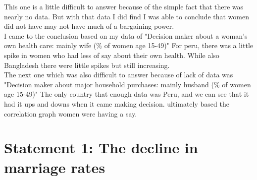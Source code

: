 \documentclass[12pt]{article}
\begin{document}
\begin{enumerate}
This one is a little difficult to answer because of the simple fact that there was nearly no data. But with that data I did find I was able to conclude that women did not have may not have much of a bargaining power.\\

I came to the conclusion based on my data of  "Decision maker about a woman's own health care: mainly wife (\% of women age 15-49)" For peru, there was a little spike in women who had less of say about their own health.  While also Bangladesh there were little spikes but still increasing. \\


The next one which was also difficult to answer because of lack of data was "Decision maker about major household purchases: mainly husband (\% of women age 15-49)"
The only country that enough data was Peru, and we can see that it had it ups and downs when it came making decision. ultimately based the correlation graph women were having a say.  


\end{enumerate}

\section{Statement 1: The decline in marriage rates}
\end{document}
